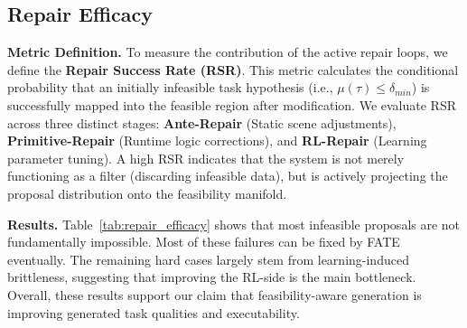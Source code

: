 \documentclass{article}
\theoremstyle{plain}
\theoremstyle{definition}
\theoremstyle{remark}
\begin{document}
\subsection{Repair Efficacy}
\label{sec:exp_repair}
\textbf{Metric Definition.}
To measure the contribution of the active repair loops, we define the \textbf{Repair Success Rate (RSR)}. This metric calculates the conditional probability that an initially infeasible task hypothesis (i.e., $\mu(\tau) \le \delta_{min}$) is successfully mapped into the feasible region after modification. We evaluate RSR across three distinct stages: \textbf{Ante-Repair} (Static scene adjustments), \textbf{Primitive-Repair} (Runtime logic corrections), and \textbf{RL-Repair} (Learning parameter tuning). A high RSR indicates that the system is not merely functioning as a filter (discarding infeasible data), but is actively projecting the proposal distribution onto the feasibility manifold.
\begin{table}[h]
\centering
\caption{\textbf{Repair Efficacy Analysis.} We report the Repair Success Rate (RSR) across three stages. The "Detected Failures" represents tasks identified as lying outside the manifold, and "Successful Repairs" denotes tasks successfully projected onto the manifold.}
\label{tab:repair_efficacy}
\end{table}
\textbf{Results.} Table~\ref{tab:repair_efficacy} shows that most infeasible proposals are not fundamentally impossible. Most of these failures can be fixed by FATE eventually. The remaining hard cases largely stem from learning-induced brittleness, suggesting that improving the RL-side is the main bottleneck. Overall, these results support our claim that feasibility-aware generation is improving generated task qualities and executability.
\end{document}
